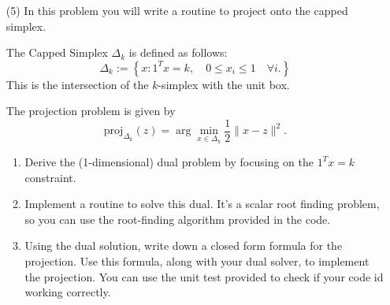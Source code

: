 \documentclass[11pt]{amsart}
\begin{document}
\vskip 16pt
\begin{enumerate}
\item[(5)] In this problem you will write a routine to project onto the capped simplex. 

The Capped Simplex $\Delta_k$ is defined as follows: 
\[
\Delta_k := \left\{x: 1^Tx = k, \quad 0 \leq x_i \leq 1 \quad \forall i. \right\}
\]
This is the intersection of the $k$-simplex with the unit box. 

The projection problem is given by 
\[
\mbox{proj}_{\Delta_k}(z) = \arg\min_{x \in \Delta_k} \frac{1}{2}\|x-z\|^2.
\]
\begin{enumerate}
\item Derive the (1-dimensional) dual problem by focusing on the $1^Tx = k$ constraint. 
\bigskip \bigskip
\item Implement a routine to solve this dual. It's a scalar root finding problem, 
so you can use the root-finding algorithm provided in the code.  
\bigskip \bigskip
\item Using the dual solution, write down a closed form formula for the projection.  
Use this formula, along with your dual solver, to implement the projection. You can use the unit test 
provided to check if your code id working correctly. 


\end{enumerate}




\end{enumerate}
\end{document}
